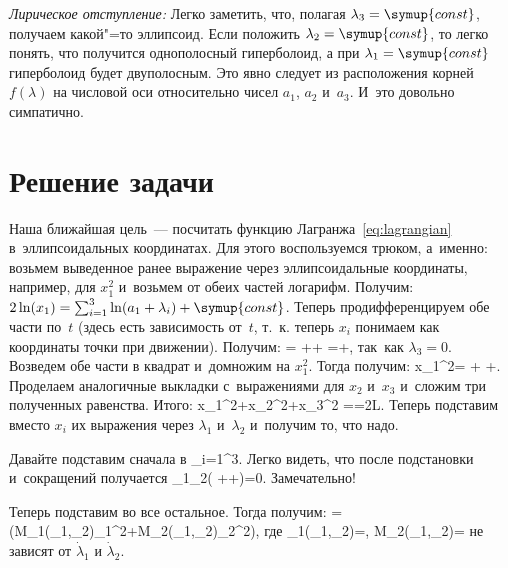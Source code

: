 \documentclass[a4paper,11pt]{article}
\def\[#1\]{\begin{align*}#1\end{align*}}
\begin{document}
\textit{Лирическое отступление:} Легко заметить, что, полагая
$\lambda_3=\symup{const}$, получаем какой"=то эллипсоид. Если положить
$\lambda_2=\symup{const}$, то легко понять, что получится однополосный
гиперболоид, а при $\lambda_1=\symup{const}$ гиперболоид будет двуполосным. Это
явно следует из расположения корней $f(\lambda)$ на числовой оси относительно
чисел $a_1$, $a_2$ и~$a_3$. И~это довольно симпатично.

\section{Решение задачи}

Наша ближайшая цель~— посчитать функцию Лагранжа~\eqref{eq:lagrangian}
в~эллипсоидальных координатах. Для этого
воспользуемся трюком, а~именно: возьмем выведенное ранее выражение через
эллипсоидальные координаты, например, для $x_1^2$ и~возьмем от обеих частей
логарифм. Получим: $2\ln(x_1)=\sum_{i=1}^{3}\ln(a_1+\lambda_i)+\symup{const}$.
Теперь продифференцируем обе части по~$t$ (здесь есть зависимость от~$t$, т.~к.
теперь $x_i$ понимаем как координаты точки при движении). Получим:
	\[
	\frac{2\dot x_1}{x_1}=
		++
		=+,
	\]
так~как $\lambda_3=0$. Возведем обе части в квадрат и~домножим на $x_1^2$. Тогда получим:
	\[
	4\dot x_1^2=
		+
		+.
	\]
Проделаем аналогичные выкладки с~выражениями для $x_2$ и~$x_3$ и~сложим три
полученных равенства. Итого:
	\[
	\dot x_1^2+\dot x_2^2+\dot x_3^2
		=\left[\sum_{i=1}^3\left(\frac{x_i^2\dot\lambda_1^2}{(a_i+\lambda_1)^2}
		+\frac{x_i^2\dot\lambda_2}{(a_i+\lambda_2)^2}\right)
		+\sum_{i=1}^3\frac{2x_i^2\dot\lambda_1\dot\lambda_2}{(a_i+\lambda_1)(a_i+\lambda_2)}\right]=2L.
	\]
Теперь подставим вместо $x_i$ их выражения через $\lambda_1$ и~$\lambda_2$
и~получим то, что надо.

Давайте подставим сначала в
	\[
	\sum_{i=1}^3.
	\]
Легко видеть, что после подстановки и~сокращений получается
	\[
	2\dot\lambda_1\dot\lambda_2\left(
		++\right)=0.
	\]
Замечательно!

Теперь подставим во все остальное. Тогда получим:
	\[
	L=(M_1(\lambda_1,\lambda_2)\dot\lambda_1^2+M_2(\lambda_1,\lambda_2)\dot\lambda_2^2),
	\]
где
	\[
	M_1(\lambda_1,\lambda_2)=,
	\quad
	M_2(\lambda_1,\lambda_2)=
	\]
не зависят от $\dot\lambda_1$ и $\dot\lambda_2$.
\end{document}
